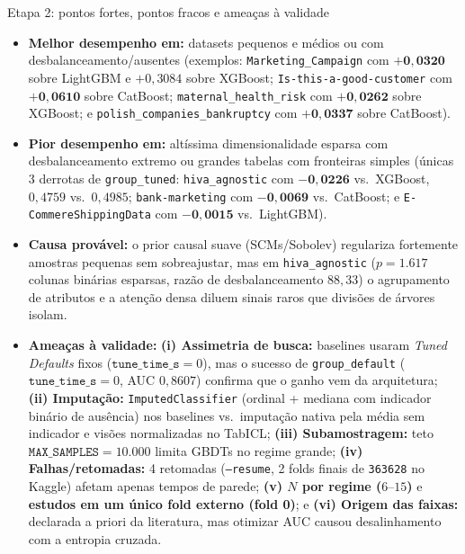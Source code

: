 \documentclass[aspectratio=169,11pt]{beamer}
\begin{document}
\begin{frame}{Etapa 2: pontos fortes, pontos fracos e ameaças à validade}
    \begin{itemize}
        \footnotesize
        \item \textbf{Melhor desempenho em:} datasets pequenos e médios ou com desbalanceamento/ausentes (exemplos: \texttt{Marketing\_Campaign} com $\mathbf{+0{,}0320}$ sobre LightGBM e $+0{,}3084$ sobre XGBoost; \texttt{Is-this-a-good-customer} com $\mathbf{+0{,}0610}$ sobre CatBoost; \texttt{maternal\_health\_risk} com $\mathbf{+0{,}0262}$ sobre XGBoost; e \texttt{polish\_companies\_bankruptcy} com $\mathbf{+0{,}0337}$ sobre CatBoost).
        \item \textbf{Pior desempenho em:} altíssima dimensionalidade esparsa com desbalanceamento extremo ou grandes tabelas com fronteiras simples (únicas 3 derrotas de \texttt{group\_tuned}: \texttt{hiva\_agnostic} com $\mathbf{-0{,}0226}$ vs.\ XGBoost, $0{,}4759$ vs.\ $0{,}4985$; \texttt{bank-marketing} com $\mathbf{-0{,}0069}$ vs.\ CatBoost; e \texttt{E-CommereShippingData} com $\mathbf{-0{,}0015}$ vs.\ LightGBM).
        \item \textbf{Causa provável:} o prior causal suave (SCMs/Sobolev) regulariza fortemente amostras pequenas sem sobreajustar, mas em \texttt{hiva\_agnostic} ($p=1.617$ colunas binárias esparsas, razão de desbalanceamento $88{,}33$) o agrupamento de atributos e a atenção densa diluem sinais raros que divisões de árvores isolam.
        \item \textbf{Ameaças à validade:} \textbf{(i) Assimetria de busca:} baselines usaram \textit{Tuned Defaults} fixos ($\texttt{tune\_time\_s}=0$), mas o sucesso de \texttt{group\_default} ($\texttt{tune\_time\_s}=0$, AUC $0{,}8607$) confirma que o ganho vem da arquitetura; \textbf{(ii) Imputação:} \texttt{ImputedClassifier} (ordinal + mediana com indicador binário de ausência) nos baselines vs.\ imputação nativa pela média sem indicador e visões normalizadas no TabICL; \textbf{(iii) Subamostragem:} teto $\texttt{MAX\_SAMPLES}=10.000$ limita GBDTs no regime grande; \textbf{(iv) Falhas/retomadas:} 4 retomadas (\texttt{--resume}, 2 folds finais de \texttt{363628} no Kaggle) afetam apenas tempos de parede; \textbf{(v) $N$ por regime ($6\text{--}15$)} e \textbf{estudos em um único fold externo (fold 0)}; e \textbf{(vi) Origem das faixas:} declarada a priori da literatura, mas otimizar AUC causou desalinhamento com a entropia cruzada.
    \end{itemize}
\end{frame}
\end{document}
